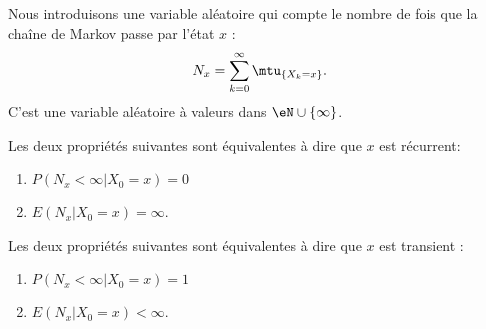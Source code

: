 Nous introduisons une variable aléatoire qui compte le nombre de fois que la chaîne de Markov passe par l'état \( x\) :
\begin{equation}    \label{EqDefNxmtuXkn}
    N_x=\sum_{k=0}^{\infty}\mtu_{\{ X_k=x\}}.
\end{equation}
C'est une variable aléatoire à valeurs dans \( \eN\cup\{ \infty \}\).

\begin{proposition} \label{PropEquivEPrecuequiv}
    Les deux propriétés suivantes sont équivalentes à dire que \( x\) est récurrent:
    \begin{enumerate}
        \item
            \( P(N_x<\infty|X_0=x)=0\)
        \item
            \( E(N_x|X_0=x)=\infty\).
    \end{enumerate}
    Les deux propriétés suivantes sont équivalentes à dire que \( x\) est transient :
    \begin{enumerate}
        \item   \label{ItemiMnGpD}
            \( P(N_x<\infty|X_0=x)=1\)
        \item
            \( E(N_x|X_0=x)<\infty\).
    \end{enumerate}
\end{proposition}

